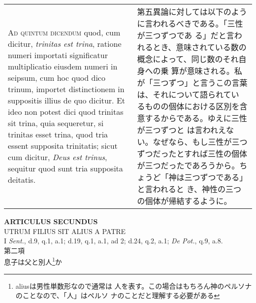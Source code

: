 \documentclass[10pt]{jsarticle} %
\begin{document}
\begin{longtable}{p{21em}p{21em}}
{\scshape Ad quintum dicendum} quod, cum dicitur, {\itshape trinitas est trina}, ratione
numeri importati significatur multiplicatio eiusdem numeri in seipsum,
cum hoc quod dico trinum, importet distinctionem in suppositis illius
de quo dicitur. Et ideo non potest dici quod trinitas sit trina, quia
sequeretur, si trinitas esset trina, quod tria essent supposita
trinitatis; sicut cum dicitur, {\itshape Deus est trinus}, sequitur quod sunt
tria supposita deitatis.


&


第五異論に対しては以下のように言われるべきである。「三性が三つずつであ
 る」だと言われるとき、意味されている数の概念によって、同じ数のそれ自身への乗
 算が意味される。私が「三つずつ」と言うこの言葉は、それについて語られてい
 るものの個体における区別を含意するからである。ゆえに三性が三つずつと
 は言われえない。なぜなら、もし三性が三つずつだったとすれば三性の個体
 が三つだったであろうから。ちょうど「神は三つずつである」と言われると
 き、神性の三つの個体が帰結するように。



\end{longtable}
\newpage


\begin{center}
{\Large {\bf ARTICULUS SECUNDUS}}\\
{\large UTRUM FILIUS SIT ALIUS A PATRE}\\
{\footnotesize I {\itshape Sent.}, d.9, q.1, a.1; d.19, q.1, a.1, ad
 2; d.24, q.2, a.1; {\itshape De Pot.}, q.9, a.8.}\\
{\Large 第二項\\息子は父と別人\footnote{aliusは男性単数形なので通常は
 人を表す。この場合はもちろん神のペルソナのことなので、「人」はペルソ
 ナのことだと理解する必要がある}か}
\end{center}
\end{document}
